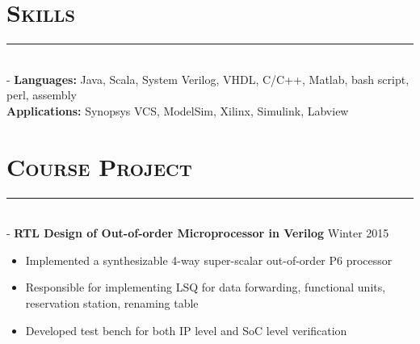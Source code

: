 \documentclass[12pt]{res}
\newcommand{\style}[1]{\color{Blue}\large\textsc{#1}}
\begin{document}
\begin{resume}
   
\section{\style{Skills}}
\vspace{-10pt}
\rule{18cm}{0.5mm}\\
 -\sectionwidth \resumewidth
 \textbf{Languages:}  Java, Scala, System Verilog, VHDL, C/C++, Matlab, bash script, perl, assembly    \hfill \vspace{-0.5mm}\\
 \textbf{Applications:} Synopsys VCS,  ModelSim, Xilinx, Simulink, Labview\\%

   
   
   \vspace{-25pt}
\section{\style{Course Project}}
\vspace{-10pt}
\rule{18cm}{0.5mm}\\
 -\sectionwidth \resumewidth
 \textbf{RTL Design of Out-of-order Microprocessor in Verilog}  \hfill{Winter 2015} \hspace{-0.58in}\vspace{-0mm}\\
  \vspace{-14pt}
 \begin{itemize}[leftmargin=-0.1in]
  \item Implemented a synthesizable 4-way super-scalar out-of-order P6  processor \vspace{-4pt}
  \item Responsible for implementing LSQ for data forwarding, functional units,  reservation station, renaming table\vspace{-4pt}
  \item Developed test bench for both IP level and SoC level verification\vspace{-3pt}


\end{itemize}
\end{resume}
\end{document}
